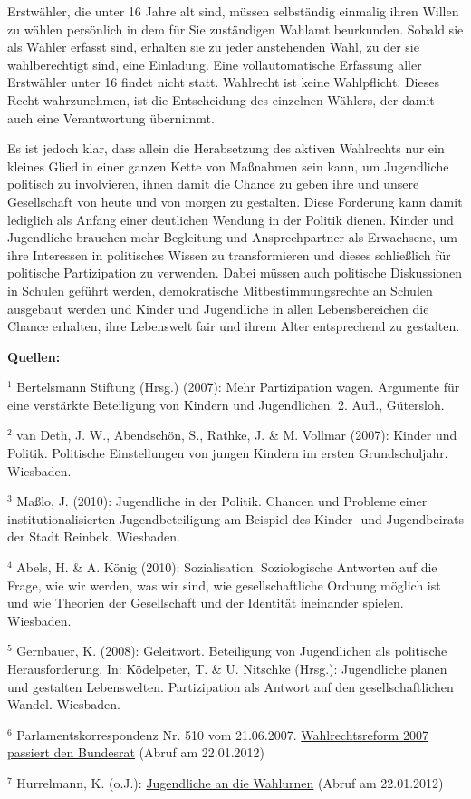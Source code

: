 {Erstwähler, die unter 16 Jahre alt sind, müssen selbständig einmalig ihren Willen zu wählen persönlich in dem für Sie zuständigen Wahlamt beurkunden. Sobald sie als Wähler erfasst sind, erhalten sie zu jeder anstehenden Wahl, zu der sie wahlberechtigt sind, eine Einladung. Eine vollautomatische Erfassung aller Erstwähler unter 16 findet nicht statt. Wahlrecht ist keine Wahlpflicht. Dieses Recht wahrzunehmen, ist die Entscheidung des einzelnen Wählers, der damit auch eine Verantwortung übernimmt.

Es ist jedoch klar, dass allein die Herabsetzung des aktiven Wahlrechts nur ein kleines Glied in einer ganzen Kette von Maßnahmen sein kann, um Jugendliche politisch zu involvieren, ihnen damit die Chance zu geben ihre und unsere Gesellschaft von heute und von morgen zu gestalten. Diese Forderung kann damit lediglich als Anfang einer deutlichen Wendung in der Politik dienen. Kinder und Jugendliche brauchen mehr Begleitung und Ansprechpartner als Erwachsene, um ihre Interessen in politisches Wissen zu transformieren und dieses schließlich für politische Partizipation zu verwenden. Dabei müssen auch politische Diskussionen in Schulen geführt werden, demokratische Mitbestimmungsrechte an Schulen ausgebaut werden und Kinder und Jugendliche in allen Lebensbereichen die Chance erhalten, ihre Lebenswelt fair und ihrem Alter entsprechend zu gestalten.

\textbf{Quellen:}

$^1$ Bertelsmann Stiftung (Hrsg.) (2007): Mehr Partizipation wagen. Argumente für eine verstärkte Beteiligung von Kindern und Jugendlichen. 2. Aufl., Gütersloh.

$^2$ van Deth, J. W., Abendschön, S., Rathke, J. \& M. Vollmar (2007): Kinder und Politik. Politische Einstellungen von jungen Kindern im ersten Grundschuljahr. Wiesbaden.

$^3$ Maßlo, J. (2010): Jugendliche in der Politik. Chancen und Probleme einer institutionalisierten Jugendbeteiligung am Beispiel des Kinder- und Jugendbeirats der Stadt Reinbek. Wiesbaden.

$^4$ Abels, H. \& A. König (2010): Sozialisation. Soziologische Antworten auf die Frage, wie wir werden, was wir sind, wie gesellschaftliche Ordnung möglich ist und wie Theorien der Gesellschaft und der Identität ineinander spielen. Wiesbaden.

$^5$ Gernbauer, K. (2008): Geleitwort. Beteiligung von Jugendlichen als politische Herausforderung. In: Ködelpeter, T. \& U. Nitschke (Hrsg.): Jugendliche planen und gestalten Lebenswelten. Partizipation als Antwort auf den gesellschaftlichen Wandel. Wiesbaden.

$^6$ {\Gu}Parlamentskorrespondenz Nr. 510 vom 21.06.2007. \href{http://www.parlinkom.gv.at/PAKT/PR/JAHR_2007/PK0510/index.shtml}{Wahlrechtsreform 2007 passiert den Bundesrat}{\Go} (Abruf am 22.01.2012)

$^7$ Hurrelmann, K. (o.J.): \href{http://gedankensex.de/2011/08/23/jugendliche-an-die-wahlurnen/}{Jugendliche an die Wahlurnen} (Abruf am 22.01.2012)
}

